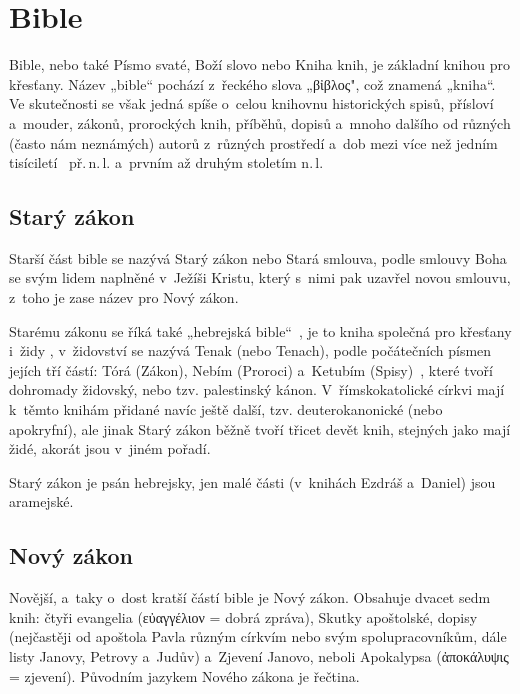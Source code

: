 \documentclass[a4paper,11pt,oneside]{article}
\begin{document}


\section{Bible}

Bible, nebo také Písmo svaté, Boží slovo nebo Kniha knih, je základní knihou pro křesťany. Název „bible“ pochází z~řeckého slova „\textgreek{βἰβλος}", což znamená „kniha“. Ve skutečnosti se však jedná spíše o~celou knihovnu historických spisů, přísloví a~mouder, zákonů, prorockých knih, příběhů, dopisů a~mnoho dalšího od různých (často nám neznámých) autorů z~různých prostředí a~dob mezi více než jedním tisíciletí~ př.\,n.\,l. a~prvním až druhým stoletím n.\,l.

\subsection{Starý zákon}

Starší část bible se nazývá Starý zákon nebo Stará smlouva, podle smlouvy Boha se svým lidem naplněné v~Ježíši Kristu, který s~nimi pak uzavřel novou smlouvu, z~toho je zase název pro Nový zákon.

Starému zákonu se říká také „hebrejská bible“~\cite{online-bible}, je to kniha společná pro křesťany i~židy , v~židovství se nazývá Tenak (nebo Tenach), podle počátečních písmen jejích tří částí: Tórá (Zákon), Nebím (Proroci) a~Ketubím (Spisy)~\cite[strana 17]{cep},  které tvoří dohromady židovský, nebo tzv. palestinský kánon. V~římskokatolické církvi  mají k~těmto knihám přidané navíc ještě další, tzv. deuterokanonické (nebo apokryfní), ale jinak Starý zákon běžně tvoří třicet devět knih, stejných jako mají židé, akorát jsou v~jiném pořadí.

Starý zákon je psán hebrejsky, jen malé části (v~knihách Ezdráš a~Daniel) jsou aramejské.

\subsection{Nový zákon}

Novější, a~taky o~dost kratší částí bible je Nový zákon. Obsahuje dvacet sedm knih: čtyři evangelia (\textgreek{εὐαγγέλιον} = dobrá zpráva), Skutky apoštolské, dopisy (nejčastěji od apoštola Pavla různým církvím nebo svým spolupracovníkům, dále listy Janovy, Petrovy a~Judův) a~Zjevení Janovo, neboli Apokalypsa (\textgreek{ἀποκάλυψις} = zjevení). Původním jazykem Nového zákona je řečtina.
\end{document}
